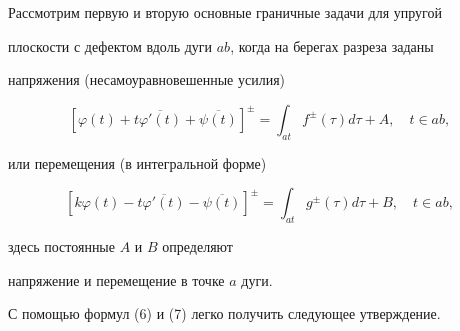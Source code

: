Рассмотрим первую и вторую основные граничные задачи для упругой


плоскости с дефектом вдоль дуги $ab$, когда на берегах разреза заданы


напряжения (несамоуравновешенные усилия)


$$


[\varphi(t)+t\overline{\varphi'(t)}+\overline{\psi(t)}]^{\pm} =


\int_{at}f^{\pm}(\tau)d\tau + A,\quad t\in ab,


$$


или перемещения (в интегральной форме)


$$


[k\varphi(t)-t\overline{\varphi'(t)}-\overline{\psi(t)}]^{\pm} =


\int_{at}g^{\pm}(\tau)d\tau + B, \quad t\in ab,


$$


здесь постоянные $A$ и $B$ определяют


напряжение и перемещение в точке $a$ дуги.





С помощью формул (6) и (7) легко получить следующее утверждение.






